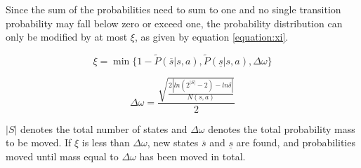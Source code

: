 Since the sum of the probabilities need to sum to one and 
no single transition probability may fall below zero or exceed one, the probability distribution can only be modified by at most $\xi$, as given by
equation \eqref{equation:xi}. 

\begin{equation}
\label{equation:xi}
\xi = \min\{
  1 - \tilde{P}(\overline{s} | s, a)
  , \tilde{P}(\underline{s} | s, a)
  , \Delta \omega 
\}
\end{equation}

\begin{equation}
  \Delta \omega = \frac{\sqrt{\frac{2|ln(2^{|S|}-2) - ln  \delta |}{N(s,a)}}}{2}
\end{equation}

$|S|$ denotes the total number of states and $\Delta \omega$ denotes the total
probability mass to be moved. If $\xi$ is less than $\Delta \omega$, new states
$\overline{s}$ and $\underline{s}$ are found, and probabilities moved until
mass equal to $\Delta \omega$ has been moved in total. 

\label{goto}
